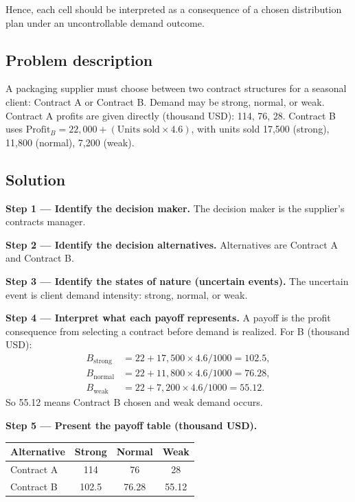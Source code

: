 \begin{ExamProblems}
		Hence, each cell should be interpreted as a consequence of a chosen distribution plan under an uncontrollable demand outcome.
		
		\item
		\subsection*{Problem description}
		A packaging supplier must choose between two contract structures for a seasonal client:
		Contract A or Contract B. Demand may be strong, normal, or weak.
		Contract A profits are given directly (thousand USD): 114, 76, 28.
		Contract B uses
		\(\text{Profit}_B=22{,}000+(\text{Units sold}\times4.6)\),
		with units sold 17{,}500 (strong), 11{,}800 (normal), 7{,}200 (weak).
		
		\subsection*{Solution}
		\textbf{Step 1 --- Identify the decision maker.} The decision maker is the supplier's contracts manager.
		
		\textbf{Step 2 --- Identify the decision alternatives.} Alternatives are Contract A and Contract B.
		
		\textbf{Step 3 --- Identify the states of nature (uncertain events).} The uncertain event is client demand intensity: strong, normal, or weak.
		
		\textbf{Step 4 --- Interpret what each payoff represents.} A payoff is the profit consequence from selecting a contract before demand is realized. For B (thousand USD):
		\[
		\begin{aligned}
		B_{\text{strong}}&=22+17{,}500\times4.6/1000=102.5,\\
		B_{\text{normal}}&=22+11{,}800\times4.6/1000=76.28,\\
		B_{\text{weak}}&=22+7{,}200\times4.6/1000=55.12.
		\end{aligned}
		\]
		So 55.12 means Contract B chosen and weak demand occurs.
		
		\textbf{Step 5 --- Present the payoff table (thousand USD).}
		\begin{center}
			\begin{tabular}{l c c c}
				\toprule
				Alternative & Strong & Normal & Weak \\
				\midrule
				Contract A & 114 & 76 & 28 \\
				Contract B & 102.5 & 76.28 & 55.12 \\
				\bottomrule
			\end{tabular}
		\end{center}
		

\end{ExamProblems}
